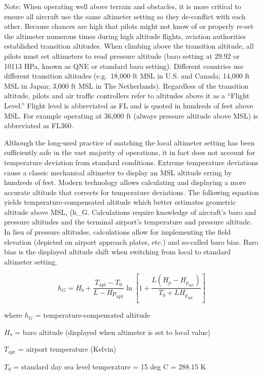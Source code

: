 \documentclass[
]{book}
\begin{document}
Note: When operating well above terrain and obstacles, it is more critical to ensure all aircraft use the same altimeter setting so they de-conflict with each other. Because chances are high that pilots might not know of or properly re-set the altimeter numerous times during high altitude flights, aviation authorities established transition altitudes. When climbing above the transition altitude, all pilots must set altimeters to read pressure altitude (baro setting at 29.92 or 10113 HPa, known as QNE or standard baro setting). Different countries use different transition altitudes (e.g.~18,000 ft MSL in U.S. and Canada; 14,000 ft MSL in Japan; 3,000 ft MSL in The Netherlands). Regardless of the transition altitude, pilots and air traffic controllers refer to altitudes above it as a ``Flight Level.'' Flight level is abbreviated as FL and is quoted in hundreds of feet above MSL. For example operating at 36,000 ft (always pressure altitude above MSL) is abbreviated as FL360.

Although the long-used practice of matching the local altimeter setting has been sufficiently safe in the vast majority of operations, it in fact does not account for temperature deviation from standard conditions. Extreme temperature deviations cause a classic mechanical altimeter to display an MSL altitude erring by hundreds of feet. Modern technology allows calculating and displaying a more accurate altitude that corrects for temperature deviations. The following equation yields temperature-compensated altitude which better estimates geometric altitude above MSL, (h\_G. Calculations require knowledge of aircraft's baro and pressure altitudes and the terminal airport's temperature and pressure altitude. In lieu of pressure altitudes, calculations allow for implementing the field elevation (depicted on airport approach plates, etc.) and so-called baro bias. Baro bias is the displayed altitude shift when switching from local to standard altimeter setting.

\[h_G = H_b + \frac{T_{\mathrm{apt}} - T_0}{L - Hp_{\mathrm{apt}} } \ln \left[ 1 + \frac{L \left( H_p - H_{p_{\mathrm{apt}}} \right) }{T_0 + L H_{p_{\mathrm{apt}}}} \right]\]

where
\(h_G\) = temperature-compensated altitude

\(H_b\) = baro altitude (displayed when altimeter is set to local value)

\(T_{\mathrm{apt}}\) = airport temperature (Kelvin)

\(T_0\) = standard day sea level temperature = 15 deg C = 288.15 K
\end{document}
